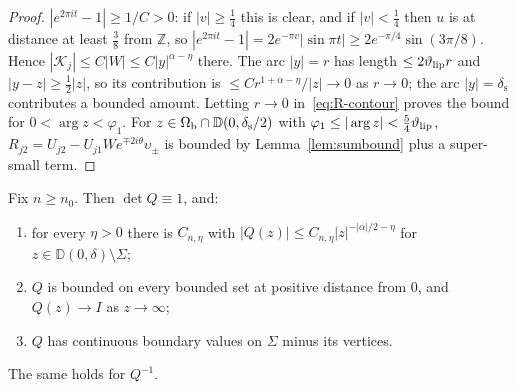 \begin{proof}
$|e^{2\pi it}-1|\ge1/C>0$: if $|v|\ge\frac14$ this is clear, and if $|v|<\frac14$ then $u$ is at distance at least $\frac38$ from
$\mathbb Z$, so $|e^{2\pi it}-1|=2e^{-\pi v}|\sin\pi t|\ge2e^{-\pi/4}\sin(3\pi/8)$. Hence $|\mathcal K_j|\le C|W|\le C|y|^{\alpha-\eta}$
there. The arc $|y|=r$ has length $\le2\vartheta_{\mathrm{lip}} r$ and $|y-z|\ge\frac12|z|$, so its contribution is $\le Cr^{1+\alpha-\eta}/|z|\to0$
as $r\to0$; the arc $|y|=\delta_{\mathrm s}$ contributes a bounded amount. Letting $r\to0$ in~\eqref{eq:R-contour} proves the bound for
$0<\arg z<\varphi_1$. For $z\in\Omega_{\mathrm{b}}\cap \mathbb D(0,\delta_{\mathrm s}/2)$ with $\varphi_1\le|\arg z|<\frac54\vartheta_{\mathrm{lip}}$, $R_{j2}=U_{j2}-U_{j1}We^{\mp2i\theta}\upsilon_\pm$
is bounded by Lemma~\ref{lem:sumbound} plus a super-small term.
\end{proof}

\begin{proposition}\label{prop:apriori}
Fix $n\ge n_0$. Then $\det Q\equiv1$, and:
\begin{enumerate}
\item[(i)] for every $\eta>0$ there is $C_{n,\eta}$ with $|Q(z)|\le C_{n,\eta}|z|^{-|\alpha|/2-\eta}$ for $z\in \mathbb D(0,\delta)\setminus\Sigma$;
\item[(ii)] $Q$ is bounded on every bounded set at positive distance from $0$, and $Q(z)\to I$ as $z\to\infty$;
\item[(iii)] $Q$ has continuous boundary values on $\Sigma$ minus its vertices.
\end{enumerate}
The same holds for $Q^{-1}$.
\end{proposition}

